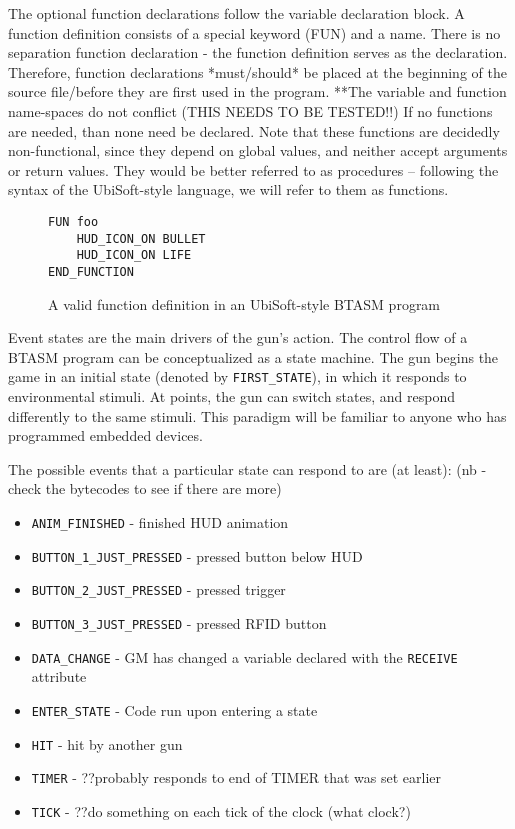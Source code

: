 \documentclass[12pt]{scrbook}
\begin{document}
The optional function declarations follow the variable declaration block.  A function definition
consists of a special keyword (FUN) and a name.  There is no separation function declaration - the
function definition serves as the declaration.  Therefore, function declarations *must/should* be
placed at the beginning of the source file/before they are first
used in the program.  **The variable and function name-spaces do not
conflict (THIS NEEDS TO BE TESTED!!)  If no functions are needed, than none need be declared.  Note 
that these functions are decidedly non-functional, since they depend on global values, and neither
accept arguments or return values.  They would be better referred to as procedures -- following the
syntax of the UbiSoft-style language, we will refer to them as functions.


  

\begin{figure}[h]
\begin{lstlisting}
FUN foo
	HUD_ICON_ON BULLET
	HUD_ICON_ON LIFE
END_FUNCTION
\end{lstlisting}
\caption{A valid function definition in an UbiSoft-style BTASM program} 
\end{figure}


Event states are the main drivers of the gun's action.  The control flow of a BTASM program can be
conceptualized as a state machine.  The gun begins the game in an initial state (denoted by 
\texttt{FIRST\_STATE}), in which it responds to environmental stimuli.  At points, the gun can switch
states, and respond differently to the same stimuli.  This paradigm will be familiar to anyone who
has programmed embedded devices.

The possible events that a particular state can respond to are (at least): (nb - check the 
bytecodes to see if there are more)
\begin{itemize}
\item \texttt{ANIM\_FINISHED} - finished HUD animation
\item \texttt{BUTTON\_1\_JUST\_PRESSED} - pressed button below HUD
\item \texttt{BUTTON\_2\_JUST\_PRESSED} - pressed trigger
\item \texttt{BUTTON\_3\_JUST\_PRESSED} - pressed RFID button
\item \texttt{DATA\_CHANGE} - GM has changed a variable declared with the \texttt{RECEIVE} attribute
\item \texttt{ENTER\_STATE} - Code run upon entering a state
\item \texttt{HIT} - hit by another gun
\item \texttt{TIMER} - ??probably responds to end of TIMER that was set earlier
\item \texttt{TICK} - ??do something on each tick of the clock (what clock?)
\end{itemize}
\end{document}
